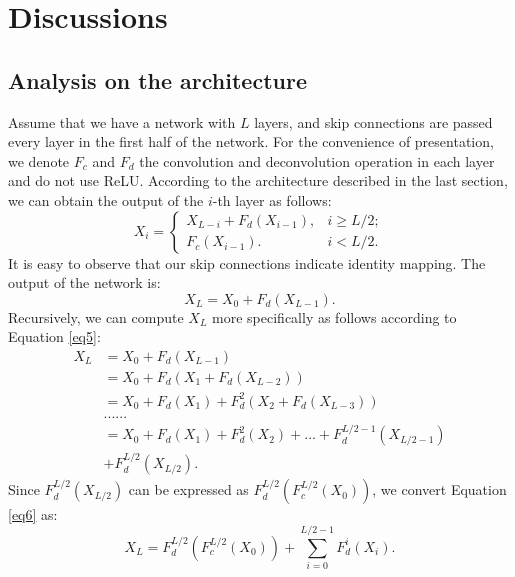 \section{Discussions}

\label{sec:disc}


\subsection{Analysis on the architecture}

Assume that we have a network with $L$ layers, and skip connections are passed every
layer in the first half of the network. For the convenience of presentation, we
denote $F_c$ and $F_d$  the convolution and deconvolution operation in each layer
and do not use ReLU. According to the architecture described in the last section,
we can obtain the output of the $i$-th layer as follows:
\begin{equation}
   X_i = \left\{
   \begin{array}{ll}
   X_{L-i} + F_d(X_{i-1}), & i\geq L/2;\\
   F_c(X_{i-1}).           & i<L/2.
   \end{array} \right.
\label{eq5}
\end{equation}
It is easy to observe that our skip connections indicate identity mapping.
The output of the network is:
\begin{equation}
X_L = X_0 + F_d(X_{L-1}).
\end{equation}
Recursively, we can compute $X_L$ more specifically as follows according to Equation \eqref{eq5}:
\begin{equation}
\begin{aligned}
X_L & = X_0 + F_d(X_{L-1}) \\
    & = X_0 + F_d(X_1 + F_d(X_{L-2})) \\
    & = X_0 + F_d(X_1) + F_d^2(X_2+F_d(X_{L-3})) \\
    & ......   \\
    & = X_0 + F_d(X_1) + F_d^2(X_2) + ... +F_d^{L/2-1}(X_{L/2-1}) \\
    & + F_d^{L/2}(X_{L/2}).
\end{aligned}
\label{eq6}
\end{equation}
Since $F_d^{L/2}(X_{L/2})$ can be expressed as $F_d^{L/2}(F_c^{L/2}(X_0))$, we convert Equation \eqref{eq6} as:
\begin{equation}
X_L = F_d^{L/2}(F_c^{L/2}(X_0)) + \sum_{i=0}^{L/2-1} F_d^i(X_i).
\label{eq7}
\end{equation}
